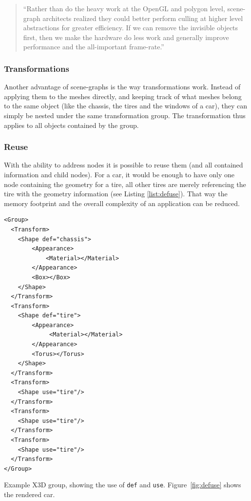 \begin{quote}
  ``Rather than do the heavy work at the \gls{OpenGL} and polygon level,
  scene-graph architects realized they could better perform culling at
  higher level abstractions for greater efficiency. If we can remove the
  invisible objects first, then we make the hardware do less work and
  generally improve performance and the all-important frame-rate.'' \cite{realityprime}
\end{quote}

\subsubsection{Transformations}\label{transformations}

Another advantage of scene-graphs is the way transformations work. Instead of applying
them to the meshes directly, and keeping track of what meshes belong to
the same object (like the chassis, the tires and the windows of a
car), they can simply be nested under the same transformation group. The
transformation thus applies to all objects contained by the group.

\subsubsection{Reuse}\label{reuse}

With the ability to address nodes it is possible to reuse them (and all contained information and child nodes). For a car, it would be enough to have only one node
containing the geometry for a tire, all other tires are merely referencing
the tire with the geometry information (see Listing \ref{list:defuse}).
That way the memory footprint and the overall complexity of an application can be reduced.

\begin{listing}
  \begin{verbatim}
<Group>
  <Transform>
    <Shape def="chassis">
        <Appearance>
            <Material></Material>
        </Appearance>
        <Box></Box>
    </Shape>
  </Transform>
  <Transform>
    <Shape def="tire">
        <Appearance>
             <Material></Material>
        </Appearance>
        <Torus></Torus>
    </Shape>
  </Transform>
  <Transform>
    <Shape use="tire"/>
  </Transform>
  <Transform>
    <Shape use="tire"/>
  </Transform>
  <Transform>
    <Shape use="tire"/>
  </Transform>
</Group>
  \end{verbatim}
  \caption{Example \gls{X3D} group, showing the use of \texttt{def} and \texttt{use}. Figure~\ref{fig:defuse} shows the rendered car.}
  \label{list:defuse}
\end{listing}

